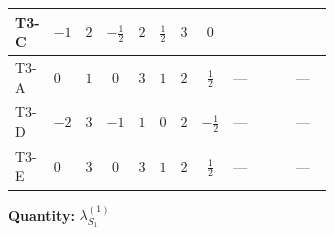 \documentclass[8pt]{article}
\begin{document}
\begin{landscape}
\begin{longtable}{@{}llcccccc >{\raggedright\arraybackslash}p{0.21\linewidth} >{\raggedright\arraybackslash}p{0.21\linewidth} >{\raggedright\arraybackslash}p{0.21\linewidth}@{}}
\midrule
T3-C & $-1$ & $2$ & $-\frac{1}{2}$ & $2$ & $\frac{1}{2}$ & $3$ & $0$ & \scriptsize\adjustbox{max width=\linewidth}{$\begin{gathered} +\frac{3 {g_1}^4}{4}\end{gathered}$} & \scriptsize\adjustbox{max width=\linewidth}{$\begin{gathered} +4 {\lambda_{12}^{(1)}}^2\end{gathered}$} & \scriptsize\adjustbox{max width=\linewidth}{$\begin{gathered} +\frac{{\lambda_{12}^{(A)}}^2}{4}\end{gathered}$} \\
\midrule
T3-A & $0$ & $1$ & $0$ & $3$ & $1$ & $2$ & $\frac{1}{2}$ & --- & \scriptsize\adjustbox{max width=\linewidth}{$\begin{gathered} 6 {\lambda_{12}^{(1)}}^2\end{gathered}$} & --- \\
\midrule
T3-D & $-2$ & $3$ & $-1$ & $1$ & $0$ & $2$ & $-\frac{1}{2}$ & --- & \scriptsize\adjustbox{max width=\linewidth}{$\begin{gathered} +2 {\lambda_{12}^{(1)}}^2\end{gathered}$} & --- \\
\midrule
T3-E & $0$ & $3$ & $0$ & $3$ & $1$ & $2$ & $\frac{1}{2}$ & --- & \scriptsize\adjustbox{max width=\linewidth}{$\begin{gathered} +6 {\lambda_{12}^{(1)}}^2\end{gathered}$} & --- \\
\midrule
\bottomrule
\end{longtable}
\clearpage
\noindent\textbf{Quantity: }$\lambda_{S_1}^{(1)}$\par\smallskip

\end{landscape}
\end{document}
